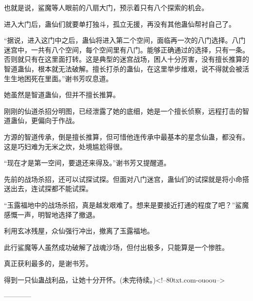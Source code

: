 \begin{this_body}
也就是说，鲨魔等人眼前的八扇大门，预示着只有八个探索的机会。

进入大门后，蛊仙们就要单打独斗，孤立无援，再没有其他蛊仙帮衬自己了。

“据说，进入这门中之后，蛊仙将进入第二个空间，面临再一次的八门选择。八门迷宫中，一共有八个空间，每个空间里有八门。能够正确通过的选择，只有一条。否则就只有在这里面打转。这是典型的迷宫战场，困人十分厉害，没有擅长推算的智道蛊仙，根本就无法破解。擅长打杀的蛊仙，在这里举步维艰，说不得就会被活生生地困死在里面。”谢书芳叹息道。

她虽然是智道蛊仙，但并不擅长推算。

刚刚的仙道杀招分明图，已经泄露了她的底细，她是一个擅长侦察，远程打击的智道蛊仙，更偏向于作战。

方源的智道传承，倒是擅长推算，但可惜他连传承中最基本的星念仙蛊，都没有。这是巧妇难为无米之炊，处境尴尬得很。

“现在才是第一空间，要退还来得及。”谢书芳又提醒道。

先前的战场杀招，还可以试探试探。但面对八门迷宫，蛊仙们的试探就是将小命搭送出去，连试探都不能试探。

“玉露福地中的战场杀招，真是越发艰难了。想来是要接近打通的程度了吧？”鲨魔感慨一声，明智地选择了撤退。

利用玄冰残屋，众仙强行冲出，撤离了玉露福地。

此行鲨魔等人虽然成功破解了战魂沙场，但付出极多，只能算是一个惨胜。

真正获利最多的，是谢书芳。

得到一只仙蛊战利品，让她十分开怀。(未完待续。)<!--80txt.com-ouoou-->

------------

\end{this_body}

